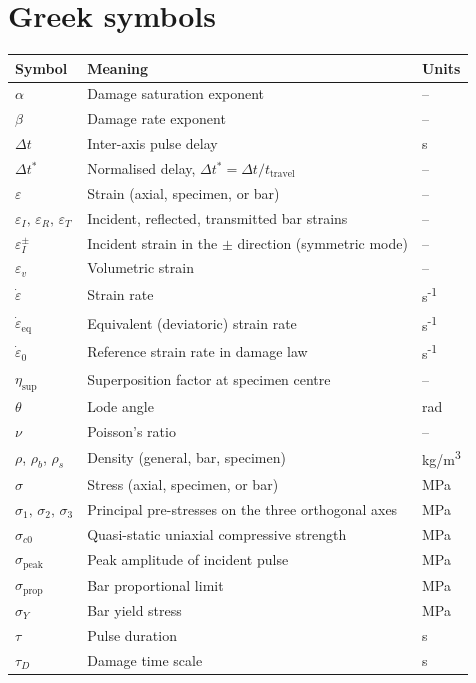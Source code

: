\documentclass[11pt,a4paper,openany]{book}
\theoremstyle{handbook}
\newcommand{\sig}{\sigma}
\newcommand{\eps}{\varepsilon}
\newcommand{\epsdot}{\dot\eps}
\newcommand{\sigprop}{\sig_{\text{prop}}}
\newcommand{\sigpeak}{\sig_{\text{peak}}}
\begin{document}
\section*{Greek symbols}
\begin{longtable}{@{}p{3.2cm}p{10cm}p{2cm}@{}}
\toprule
\textbf{Symbol} & \textbf{Meaning} & \textbf{Units} \\
\midrule
\endhead
$\alpha$ & Damage saturation exponent & -- \\
$\beta$ & Damage rate exponent & -- \\
$\Delta t$ & Inter-axis pulse delay & s \\
$\Delta t^\ast$ & Normalised delay, $\Delta t^\ast=\Delta t/t_{\text{travel}}$ & -- \\
$\eps$ & Strain (axial, specimen, or bar) & -- \\
$\eps_I,\,\eps_R,\,\eps_T$ & Incident, reflected, transmitted bar strains & -- \\
$\eps_I^{\pm}$ & Incident strain in the $\pm$ direction (symmetric mode) & -- \\
$\eps_v$ & Volumetric strain & -- \\
$\epsdot$ & Strain rate & s\textsuperscript{-1} \\
$\epsdot_{\text{eq}}$ & Equivalent (deviatoric) strain rate & s\textsuperscript{-1} \\
$\epsdot_0$ & Reference strain rate in damage law & s\textsuperscript{-1} \\
$\eta_{\text{sup}}$ & Superposition factor at specimen centre & -- \\
$\theta$ & Lode angle & rad \\
$\nu$ & Poisson's ratio & -- \\
$\rho$, $\rho_b$, $\rho_s$ & Density (general, bar, specimen) & kg/m\textsuperscript{3} \\
$\sig$ & Stress (axial, specimen, or bar) & MPa \\
$\sig_1,\,\sig_2,\,\sig_3$ & Principal pre-stresses on the three orthogonal axes & MPa \\
$\sig_{c0}$ & Quasi-static uniaxial compressive strength & MPa \\
$\sigpeak$ & Peak amplitude of incident pulse & MPa \\
$\sigprop$ & Bar proportional limit & MPa \\
$\sig_Y$ & Bar yield stress & MPa \\
$\tau$ & Pulse duration & s \\
$\tau_D$ & Damage time scale & s \\
\bottomrule
\end{longtable}
\end{document}
